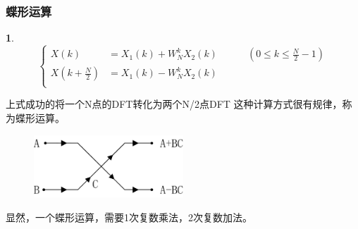 \documentclass[notheorems,compress,mathserif,table]{beamer}
\newtheorem{dablock}{}
\begin{document}
\begin{frame}[shrink]\frametitle{蝶形运算}
\begin{dablock}
\begin{equation*}
\left\{ \begin{aligned}
          X(k)\quad      &=X_{1}(k) + W_{N}^{k}X_{2}(k)  \quad\quad\quad(0\leq k\leq\frac{N}{2}-1)\\
         X(k+\frac{N}{2})&=X_{1}(k) - W_{N}^{k}X_{2}(k)  \\
\end{aligned} \right.
\end{equation*}
\end{dablock}

上式成功的将一个N点的DFT转化为两个N/2点DFT%
\newline
\pause
{\heiti 这种计算方式很有规律，称为蝶形运算。}
\begin{figure}[h]
  \centering
  \includegraphics[width=0.50\textwidth]{diexingyunsuan.jpg}
\end{figure}
显然，{\heiti 一个蝶形运算，需要1次复数乘法，2次复数加法}。
\end{frame}
\end{document}
